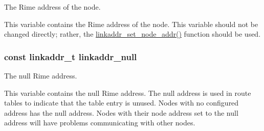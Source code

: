 The Rime address of the node. 

This variable contains the Rime address of the node. This variable should not be changed directly; rather, the \hyperlink{group__linkaddr_ga5ec363b4d4a855f1c6c3da284451415a}{linkaddr\+\_\+set\+\_\+node\+\_\+addr()} function should be used. \hypertarget{group__linkaddr_gaa8829a95f1d11a93a3ff75c8f5b2bffd}{}
\subsubsection[{linkaddr\+\_\+null}]{\setlength{\rightskip}{0pt plus 5cm}const {\bf linkaddr\+\_\+t} linkaddr\+\_\+null}\label{group__linkaddr_gaa8829a95f1d11a93a3ff75c8f5b2bffd}


The null Rime address. 

This variable contains the null Rime address. The null address is used in route tables to indicate that the table entry is unused. Nodes with no configured address has the null address. Nodes with their node address set to the null address will have problems communicating with other nodes. 